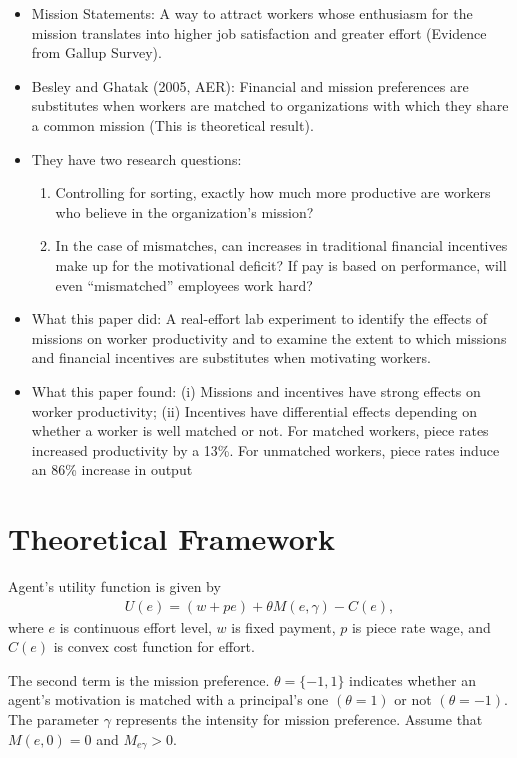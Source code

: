 \documentclass[../root]{subfiles}
\begin{document}
    \begin{itemize}
        \item Mission Statements: A way to attract workers whose enthusiasm for the mission translates into higher job satisfaction and greater effort (Evidence from Gallup Survey).
        \item Besley and Ghatak (2005, AER): Financial and mission preferences are substitutes when workers are matched to organizations with which they share a common mission (This is theoretical result).
        \item They have two research questions:
        \begin{enumerate}
            \item Controlling for sorting, exactly how much more productive are workers who believe in the organization’s mission?
            \item In the case of mismatches, can increases in traditional financial incentives make up for the motivational deficit? If pay is based on performance, will even “mismatched” employees work hard?
        \end{enumerate}
        \item What this paper did: A real-effort lab experiment to identify the effects of missions on worker productivity and to examine the extent to which missions and financial incentives are substitutes when motivating workers.
        \item What this paper found: (i) Missions and incentives have strong effects on worker productivity; (ii) Incentives have differential effects depending on whether a worker is well matched or not. For matched workers, piece rates increased productivity by a 13\%. For unmatched workers, piece rates induce an 86\% increase in output
    \end{itemize}

    \section{Theoretical Framework}

    Agent's utility function is given by 
    \begin{align*}
        U(e) = (w + pe) + \theta M(e, \gamma) - C(e), 
    \end{align*}
    where $e$ is continuous effort level, $w$ is fixed payment, $p$ is piece rate wage, 
    and $C(e)$ is convex cost function for effort.

    The second term is the mission preference. 
    $\theta = \{-1,1\}$ indicates whether an agent's motivation is matched with a principal's one $(\theta = 1)$ or not $(\theta = -1)$.
    The parameter $\gamma$ represents the intensity for mission preference.
    Assume that $M(e,0) = 0$ and $M_{e\gamma} > 0$.
\end{document}
